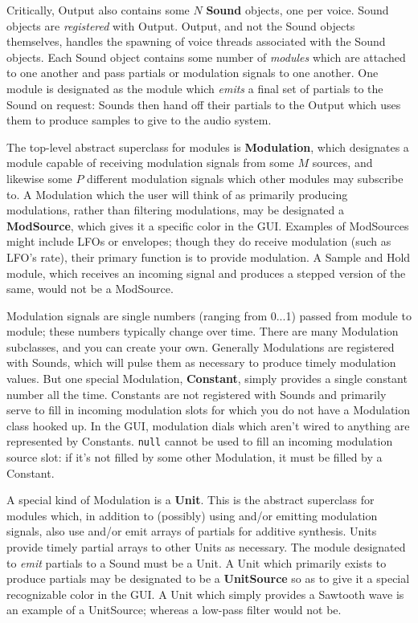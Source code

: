 \documentclass{article}
\begin{document}
Critically, Output also contains some \(N\) {\bf Sound} objects, one per voice.  Sound objects are {\it registered} with Output.  Output, and not the Sound objects themselves, handles the spawning of voice threads associated with the Sound objects.  Each Sound object contains some number of {\it modules} which are attached to one another and pass partials or modulation signals to one another.  One module is designated as the module which {\it emits} a final set of partials to the Sound on request: Sounds then hand off their partials to the Output which uses them to produce samples to give to the audio system. 

The top-level abstract superclass for modules is {\bf Modulation}, which designates a module capable of receiving modulation signals from some \(M\) sources, and likewise some \(P\) different modulation signals which other modules may subscribe to.  A Modulation which the user will think of as primarily producing modulations, rather than filtering modulations, may be designated a {\bf ModSource}, which gives it a specific color in the GUI. Examples of ModSources might include LFOs or envelopes; though they do receive modulation (such as LFO's rate), their primary function is to provide modulation.  A Sample and Hold module, which receives an incoming signal and produces a stepped version of the same, would not be a ModSource.
 
Modulation signals are single numbers (ranging from 0...1) passed from module to module; these numbers typically change over time.  There are many Modulation subclasses, and you can create your own.  Generally Modulations are registered with Sounds, which will pulse them as necessary to produce timely modulation values.  But one special Modulation, {\bf Constant}, simply provides a single constant number all the time.  Constants are not registered with Sounds and primarily serve to fill in incoming modulation slots for which you do not have a Modulation class hooked up.  In the GUI, modulation dials which aren't wired to anything are represented by Constants.  {\tt null} cannot be used to fill an incoming modulation source slot: if it's not filled by some other Modulation, it must be filled by a Constant.

A special kind of Modulation is a {\bf Unit}.  This is the abstract superclass for modules which, in addition to (possibly) using and/or emitting modulation signals, also use and/or emit arrays of partials for additive synthesis.  Units provide timely partial arrays to other Units as necessary.  The module designated to {\it emit} partials to a Sound must be a Unit.  A Unit which primarily exists to produce partials may be designated to be a {\bf UnitSource} so as to give it a special recognizable color in the GUI.  A Unit which simply provides a Sawtooth wave is an example of a UnitSource; whereas a low-pass filter would not be.
\end{document}
